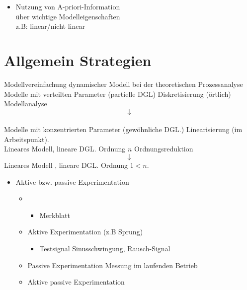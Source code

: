 \documentclass[ngerman]{tudscrreprt}
\begin{document}
\begin{itemize}
\begin{itemize}
			\end{itemize}	
		
	\item Nutzung von A-priori-Information \\
		über wichtige Modelleigenschaften \\
		z.B: linear/nicht linear
	\end{itemize}

	\section{Allgemein Strategien}

	Modellvereinfachung dynamischer Modell bei der theoretischen Prozessanalyse \\

	Modelle mit verteilten Parameter (partielle DGL) Diskretisierung (örtlich) Modellanalyse\\
	\begin{equation*} 
	\downarrow
	\end{equation*}
\\
	Modelle mit konzentrierten Parameter (gewöhnliche DGL.) Linearisierung (im Arbeitspunkt).\\
	Lineares Modell, lineare DGL. Ordnung $n$ Ordnungsreduktion\\
	\begin{equation*} 
	\downarrow
	\end{equation*}
	Lineares Modell , lineare DGL. Ordnung $1<n$. 

\begin{itemize}
\item Aktive bzw. passive Experimentation
	\begin{itemize}
	\item
	\begin{itemize}
			\item Merkblatt
		\end{itemize}
	\item Aktive Experimentation (z.B Sprung)
		\begin{itemize}
			\item Testsignal Sinusschwingung, Rausch-Signal
		\end{itemize}
\item Passive Experimentation Messung im laufenden Betrieb
\item Aktive passive Experimentation
	\end{itemize}
\end{itemize}
\newpage
\end{document}
